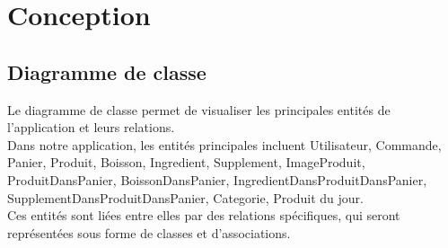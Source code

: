 

\chapter{Conception}

\section{Diagramme de classe}
Le diagramme de classe permet de visualiser les principales entités de l'application et leurs relations.\\
Dans notre application, les entités principales incluent Utilisateur, Commande, Panier, Produit, Boisson, Ingredient, Supplement, ImageProduit, ProduitDansPanier, BoissonDansPanier, IngredientDansProduitDansPanier, SupplementDansProduitDansPanier, Categorie, Produit du jour.\\
Ces entités sont liées entre elles par des relations spécifiques, qui seront représentées sous forme de classes et d'associations.\\

